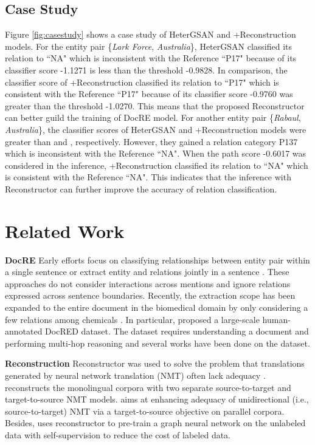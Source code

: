 \documentclass[letterpaper]{article} \usepackage{aaai21}  \usepackage{times}  \usepackage{helvet} \usepackage{courier}  \usepackage[hyphens]{url}  \usepackage{graphicx} \urlstyle{rm} \def\UrlFont{\rm}  \usepackage{natbib}  \usepackage{caption} \frenchspacing  \setlength{\pdfpagewidth}{8.5in}  \setlength{\pdfpageheight}{11in}  \usepackage{amsmath}
\begin{document}
\subsection{Case Study}
Figure \ref{fig:casestudy} shows a case study of HeterGSAN and +Reconstruction models. 
For the entity pair \{\textit{Lark Force}, \textit{Australia}\}, HeterGSAN classified its relation to ``NA" which is inconsistent with the Reference ``P17" because of its classifier score -1.1271 is less than the threshold  -0.9828.
In comparison, the classifier score of +Reconstruction classified its relation to ``P17" which is consistent with the Reference ``P17" because of its classifier score -0.9760 was greater than the threshold  -1.0270.
This means that the proposed Reconstructor can better guild the training of DocRE model.
For another entity pair \{\textit{Rabaul}, \textit{Australia}\}, the classifier scores of HeterGSAN and +Reconstruction models were greater than  and , respectively.
However, they gained a relation category P137 which is inconsistent with the Reference ``NA".
When the path score -0.6017 was considered in the inference, +Reconstruction classified its relation to ``NA" which is consistent with the Reference ``NA".
This indicates that the inference with Reconstructor can further improve the accuracy of relation classification.

\section{Related Work}
\textbf{DocRE} 
Early efforts focus on classifying relationships between entity pair within a single sentence or extract entity and relations jointly in a sentence \cite{zeng-etal-2014-relation,wang-etal-2016-relation,wei2019novel,Song_2019}. 
These approaches do not consider interactions across mentions and ignore relations expressed across sentence boundaries. 
Recently, the extraction scope has been expanded to the entire document in the biomedical domain by only considering a few relations among chemicals \cite{DBLP:journals/tacl/PengPQTY17,quirk-poon-2017-distant,DBLP:journals/corr/abs-1810-05102,zhang-etal-2018-graph,Christopoulou2019ConnectingTD}. 
In particular, \citet{yao-etal-2019-docred} proposed a large-scale human-annotated DocRED dataset.
The dataset requires understanding a document and performing multi-hop reasoning and several works \cite{Wang2019FinetuneBF,Nan2020ReasoningWL} have been done on the dataset.

\textbf{Reconstruction}
Reconstructor was used to solve the problem that translations generated by neural network translation (NMT) often lack adequacy \cite{nmt-rec,nmt-chen}. \cite{nmt-chen} reconstructs the monolingual corpora with two separate source-to-target and target-to-source NMT models. \cite{nmt-rec} aims at enhancing adequacy of unidirectional (i.e., source-to-target) NMT via a target-to-source objective on parallel corpora.
Besides, \cite{gpt-gnn} uses reconstructor to pre-train a graph neural network on the unlabeled data with self-supervision to reduce the cost of labeled data.
\end{document}
